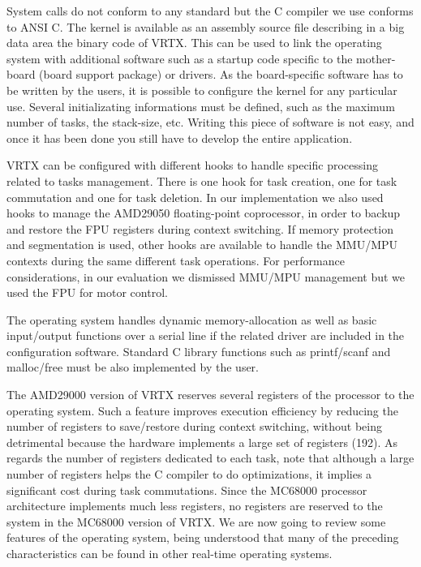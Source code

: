 \documentclass[10pt]{report}
\begin{document}
System calls do not conform to any standard but the C compiler we
use conforms to ANSI C. The kernel is available as an assembly
source file describing in a big data area the binary code of VRTX. 
This can be used to link the operating system with additional
software such as a startup code specific to the mother-board 
(board support package) or drivers. As the board-specific software
has to be written by the users, it is possible to configure the kernel
for any particular use. Several initializating informations must be
defined, such as the maximum number of tasks, the stack-size, etc. Writing
this piece of software is not easy, and once it has been done you still have to
develop the entire application.

VRTX can be configured with different hooks to handle specific
processing related to tasks management. There is one hook for
task creation, one for task commutation and one for task
deletion. In our implementation we also used hooks to manage the
AMD29050 floating-point coprocessor, in order to backup and
restore the FPU registers during context switching. If memory protection and segmentation 
is used, other hooks are available to handle the MMU/MPU contexts during the same different task
operations. For performance considerations, in our evaluation we dismissed MMU/MPU
management but we used the FPU for motor control.

The operating system handles dynamic memory-allocation as well as basic
input/output functions over a serial line if the related driver are
included in the configuration software. Standard C library
functions such as printf/scanf and malloc/free must be also
implemented by the user.

The AMD29000 version of VRTX reserves several registers of the processor 
to the operating system. Such a feature improves execution efficiency by reducing the number of
registers to save/restore during context switching, without being detrimental because
the hardware implements a large set of registers (192). As regards
the number of registers dedicated to each task, note that
although a large number of registers helps the C compiler to do
optimizations, it implies a significant cost during task commutations. 
Since the MC68000 processor architecture implements much less registers, no registers are reserved 
to the system in the MC68000 version of VRTX. We are now going to review some
features of the operating system, being understood that many of
the preceding characteristics can be found in other real-time operating systems.
\end{document}
